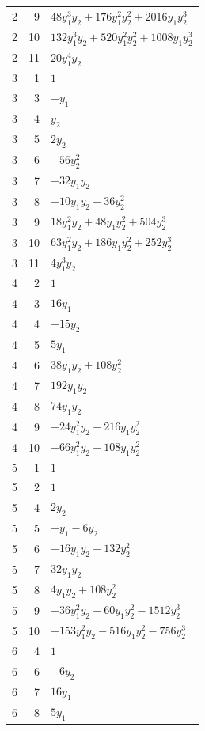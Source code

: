 \documentclass[10pt,a4paper]{article}
\begin{document}
{\begin{longtable}{rrp{125mm}}
2 & 9 & $48 y_{1}^{3} y_{2} + 176 y_{1}^{2} y_{2}^{2} + 2016 y_{1} y_{2}^{3}$\\
2 & 10 & $132 y_{1}^{3} y_{2} + 520 y_{1}^{2} y_{2}^{2} + 1008 y_{1} y_{2}^{3}$\\
2 & 11 & $20 y_{1}^{4} y_{2}$\\
3 & 1 & $1$\\
3 & 3 & $- y_{1}$\\
3 & 4 & $y_{2}$\\
3 & 5 & $2 y_{2}$\\
3 & 6 & $- 56 y_{2}^{2}$\\
3 & 7 & $- 32 y_{1} y_{2}$\\
3 & 8 & $- 10 y_{1} y_{2} - 36 y_{2}^{2}$\\
3 & 9 & $18 y_{1}^{2} y_{2} + 48 y_{1} y_{2}^{2} + 504 y_{2}^{3}$\\
3 & 10 & $63 y_{1}^{2} y_{2} + 186 y_{1} y_{2}^{2} + 252 y_{2}^{3}$\\
3 & 11 & $4 y_{1}^{3} y_{2}$\\
4 & 2 & $1$\\
4 & 3 & $16 y_{1}$\\
4 & 4 & $- 15 y_{2}$\\
4 & 5 & $5 y_{1}$\\
4 & 6 & $38 y_{1} y_{2} + 108 y_{2}^{2}$\\
4 & 7 & $192 y_{1} y_{2}$\\
4 & 8 & $74 y_{1} y_{2}$\\
4 & 9 & $- 24 y_{1}^{2} y_{2} - 216 y_{1} y_{2}^{2}$\\
4 & 10 & $- 66 y_{1}^{2} y_{2} - 108 y_{1} y_{2}^{2}$\\
5 & 1 & $1$\\
5 & 2 & $1$\\
5 & 4 & $2 y_{2}$\\
5 & 5 & $- y_{1} - 6 y_{2}$\\
5 & 6 & $- 16 y_{1} y_{2} + 132 y_{2}^{2}$\\
5 & 7 & $32 y_{1} y_{2}$\\
5 & 8 & $4 y_{1} y_{2} + 108 y_{2}^{2}$\\
5 & 9 & $- 36 y_{1}^{2} y_{2} - 60 y_{1} y_{2}^{2} - 1512 y_{2}^{3}$\\
5 & 10 & $- 153 y_{1}^{2} y_{2} - 516 y_{1} y_{2}^{2} - 756 y_{2}^{3}$\\
6 & 4 & $1$\\
6 & 6 & $- 6 y_{2}$\\
6 & 7 & $16 y_{1}$\\
6 & 8 & $5 y_{1}$\\

\end{longtable}}
\end{document}
